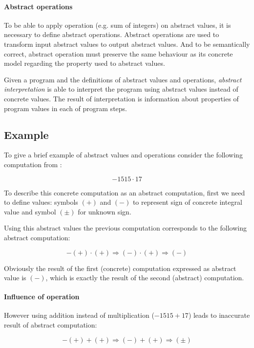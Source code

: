 \documentclass[12pt,oneside]{fithesis2}
\theoremstyle{definition}
\begin{document}
\paragraph{Abstract operations}
To be able to apply operation (e.g. sum of integers) on abstract values, it is necessary to define abstract operations. Abstract operations are used to transform input abstract values to output abstract values. And to be semantically correct, abstract operation must preserve the same behaviour as its concrete model regarding the property used to abstract values.

\vspace{1\baselineskip} %

Given a program and the definitions of abstract values and operations, \textit{abstract interpretation} is able to interpret the program using abstract values instead of concrete values. The result of interpretation is information about properties of program values in each of program steps.


\subsection{Example}\label{sec:example}

To give a brief example of abstract values and operations consider the following computation from \cite{CousotCousot77-1}:

\[ -1515 \cdot 17 \]

To describe this concrete computation as an abstract computation, first we need to define values: symbols $(+)$ and $(-)$ to represent sign of concrete integral value and symbol $(\pm)$ for unknown sign.

Using this abstract values the previous computation corresponds to the following abstract computation:

\[ -(+) \cdot (+) \Rightarrow (-) \cdot (+) \Rightarrow (-) \]

Obviously the result of the first (concrete) computation expressed as abstract value is $(-)$, which is exactly the result of the second (abstract) computation.

\paragraph{Influence of operation}
However using addition instead of multiplication ($-1515 + 17$) leads to inaccurate result of abstract computation:

\[ -(+) + (+) \Rightarrow (-) + (+) \Rightarrow (\pm) \]
\end{document}
